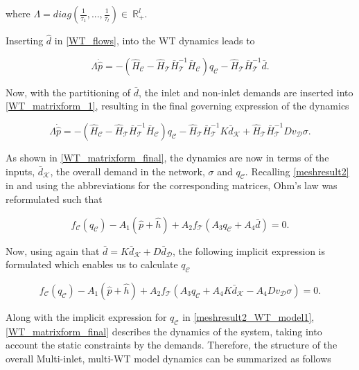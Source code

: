 where $\Lambda = diag(\frac{1}{\tau_1},... ,\frac{1}{\tau_l}) \in \: \mathbb{R}^l_+$. 

Inserting $\hat{d}$ in \eqref{WT_flows}, into the WT dynamics leads to

\begin{equation}
\label{WT_matrixform_1}
\Lambda \dot{\hat{p}} = - (\hat{H}_{\mathcal{C}} - \hat{H}_{\mathcal{T}} \bar{H}^{-1}_{\mathcal{T}}\bar{H}_{\mathcal{C}})  q_\mathcal{C}  - \hat{H}_{\mathcal{T}} \bar{H}^{-1}_{\mathcal{T}} \bar{d}.
\end{equation}

Now, with the partitioning of $\bar{d}$, the inlet and non-inlet demands are inserted into \eqref{WT_matrixform_1}, resulting in the final governing expression of the dynamics

\begin{equation}
\label{WT_matrixform_final}
\Lambda \dot{\hat{p}} = - (\hat{H}_{\mathcal{C}} - \hat{H}_{\mathcal{T}} \bar{H}^{-1}_{\mathcal{T}}\bar{H}_{\mathcal{C}})  q_\mathcal{C}  - \hat{H}_{\mathcal{T}} \bar{H}^{-1}_{\mathcal{T}} K \bar{d}_{\mathcal{K}} + \hat{H}_{\mathcal{T}} \bar{H}^{-1}_{\mathcal{T}} D v_{\mathcal{D}} \sigma .
\end{equation}

As shown in \eqref{WT_matrixform_final}, the dynamics are now in terms of the inputs, $\bar{d}_{\mathcal{K}}$, the overall demand in the network, $\sigma$ and $q_\mathcal{C}$. Recalling \eqref{meshresult2} in  and using the abbreviations for the corresponding matrices, Ohm's law was reformulated such that

 \begin{equation}
\label{meshresult2_WT_model}
f_{\mathcal{C}}(q_\mathcal{C}) -A_1(\hat{p} + \hat{h}) + A_2 f_{\mathcal{T}}(A_3 q_\mathcal{C} + A_4 \bar{d}) = 0.
\end{equation} 

Now, using again that $\bar{d} = K \bar{d}_{\mathcal{K}} + D \bar{d}_{\mathcal{D}}$, the following implicit expression is formulated which enables us to calculate $q_\mathcal{C}$

 \begin{equation}
\label{meshresult2_WT_model1}
f_{\mathcal{C}}(q_\mathcal{C}) - A_1(\hat{p} + \hat{h}) + A_2 f_{\mathcal{T}}(A_3 q_\mathcal{C} + A_4 K \bar{d}_{\mathcal{K}} - A_4 D v_{\mathcal{D}} \sigma) = 0.
\end{equation} 

Along with the implicit expression for $q_\mathcal{C}$ in \eqref{meshresult2_WT_model1}, \eqref{WT_matrixform_final} describes the dynamics of the system, taking into account the static constraints by the demands. Therefore, the structure of the overall Multi-inlet, multi-WT model dynamics can be summarized as follows

